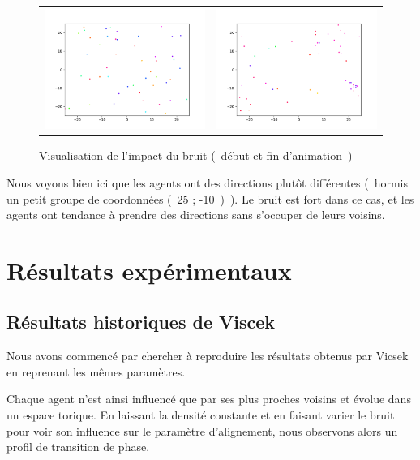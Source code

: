 \documentclass[french, a4paper, 12pt, openany]{report}
\begin{document}
	\begin{figure}[!h]
		\centering
		\begin{tabular}{cc}
			\includegraphics[width=8cm]{images/image_10.png} & \includegraphics[width=8cm]{images/image_11.png} \\
		\end{tabular}
		\caption{Visualisation de l'impact du bruit (~début et fin d'animation~)}
	\end{figure} 
	
Nous voyons bien ici que les agents ont des directions plutôt différentes (~hormis un petit groupe de coordonnées (~25 ; -10~)~). Le bruit est fort dans ce cas, et les agents ont tendance à prendre des directions sans s'occuper de leurs voisins.
   
\chapter{Résultats expérimentaux}
\section{Résultats historiques de Viscek}
	Nous avons commencé par chercher à reproduire les résultats obtenus par Vicsek en reprenant les mêmes paramètres.
	
	Chaque agent n'est ainsi influencé que par ses plus proches voisins et évolue dans un espace torique. En laissant la densité constante et en faisant varier le bruit pour voir son influence sur le paramètre d'alignement, nous observons alors un profil de transition de phase.
	
\end{document}
